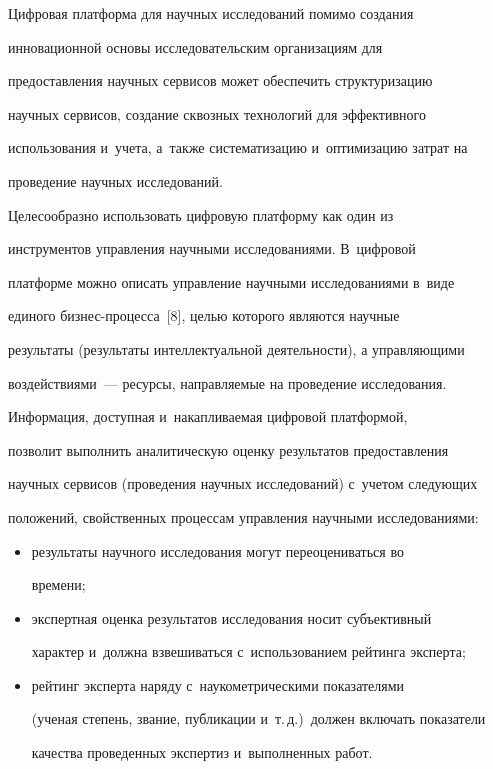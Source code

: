      Цифровая платформа для научных исследований помимо создания 


инновационной основы исследовательским организациям для 


предоставления научных сервисов может обеспечить структуризацию 


научных сервисов, создание сквозных технологий для эффективного 


использования и~учета, а~также систематизацию и~оптимизацию затрат на 


проведение научных исследований.


     


     Целесообразно использовать цифровую платформу как один из 


инструментов управления научными исследованиями. В~цифровой 


платформе можно описать управление научными исследованиями в~виде 


единого биз\-нес-про\-цес\-са~[8], целью которого являются научные 


результаты (результаты интеллектуальной деятельности), а управляющими 


воздействиями~--- ресурсы, направляемые на проведение исследования.


     


     Информация, доступная и~накапливаемая цифровой платформой, 


позволит выполнить аналитическую оценку результатов предоставления 


научных сервисов (проведения научных исследований) с~учетом следующих 


положений, свойственных процессам управления научными исследованиями:


     \begin{itemize}


     \item результаты научного исследования могут переоцениваться во 


времени; %


     \item экспертная оценка результатов исследования носит субъективный 


характер и~должна взвешиваться с~использованием рейтинга эксперта; %


     \item рейтинг эксперта наряду с~наукометрическими показателями 


(ученая степень, звание, публикации и~т.\,д.)\ должен включать показатели 


качества проведенных экспертиз и~выполненных работ.


     \end{itemize}


